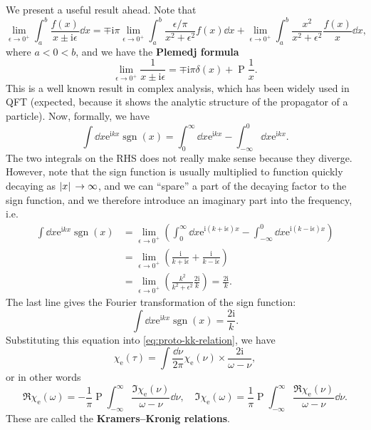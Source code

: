 \documentclass[hyperref, a4paper]{article}
\DeclareMathOperator{\primevalue}{P}
\DeclareMathOperator{\sgn}{sgn}
\newcommand*{\ii}{\mathrm{i}}
\newcommand*{\ee}{\mathrm{e}}
\newcommand*{\concept}[1]{{\textbf{#1}}}
\begin{document}
We present a useful result ahead. Note that 
\[
    \lim_{\epsilon \to 0^+} \int_a^b \frac{f(x)}{x \pm \ii \epsilon} \dd{x} = \mp \ii \pi \lim_{\epsilon \to 0^+} \int_a^b \frac{\epsilon / \pi}{x^2 + \epsilon^2} f(x) \dd{x} + \lim_{\epsilon \to 0^+} \int_a^b \frac{x^2}{x^2 + \epsilon^2} \frac{f(x)}{x} \dd{x} ,
\]
where $a < 0 < b$, and we have the \concept{Plemedj formula}
\begin{equation}
    \lim_{\epsilon \to 0^+} \frac{1}{x \pm \ii \epsilon} = \mp \ii \pi \delta(x) + \primevalue \frac{1}{x}.
\end{equation}
This is a well known result in complex analysis, which has been widely used in QFT (expected, because it shows the analytic structure of the propagator of a particle).
Now, formally, we have 
\[
    \int \dd{x} \ee^{\ii k x} \sgn(x) = \int_0^\infty \dd{x} \ee^{\ii k x} - \int^0_{-\infty} \dd{x} \ee^{\ii k x} .
\]
The two integrals on the RHS does not really make sense because they diverge.
However, note that the sign function is usually multiplied to  function quickly decaying as $\abs*{x} \to \infty$, and we can ``spare'' a part of the decaying factor to the sign function, and we therefore introduce an imaginary part into the frequency, i.e.
\[
    \begin{aligned}
        \int \dd{x} \ee^{\ii k x} \sgn(x) &= \lim_{\epsilon \to 0^+} \left(\int_0^\infty \dd{x} \ee^{\ii (k + \ii \epsilon) x} - \int^0_{-\infty} \dd{x} \ee^{\ii (k - \ii \epsilon) x}\right) \\
        &= \lim_{\epsilon \to 0^+} \left( \frac{\ii}{k + \ii \epsilon} + \frac{\ii}{k - \ii \epsilon} \right) \\
        &= \lim_{\epsilon \to 0^+} \left( \frac{k^2}{k^2 + \epsilon^2} \frac{2 \ii }{k} \right) = \frac{2\ii}{k}. 
    \end{aligned}
\]
The last line gives the Fourier transformation of the sign function:
\begin{equation}
    \int \dd{x} \ee^{\ii k x} \sgn(x) = \frac{2\ii}{k}. 
\end{equation}
Substituting this equation into \eqref{eq:proto-kk-relation}, we have 
\[
    \chi_\text{e}(\tau) = \int \frac{\dd{\nu}}{2\pi}\chi_\text{e}(\nu) \times \frac{2\ii}{\omega - \nu},
\]
or in other words
\begin{equation}
    \Re \chi_\text{e}(\omega) = - \frac{1}{\pi} \primevalue \int_{-\infty}^\infty \frac{\Im \chi_\text{e}(\nu)}{\omega - \nu} \dd{\nu}, \quad \Im \chi_\text{e}(\omega) = \frac{1}{\pi} \primevalue \int_{-\infty}^\infty \frac{\Re \chi_\text{e}(\nu)}{\omega - \nu} \dd{\nu}.
    \label{eq:kk-relation}
\end{equation}
These are called the \concept{Kramers–Kronig relations}.
\end{document}
